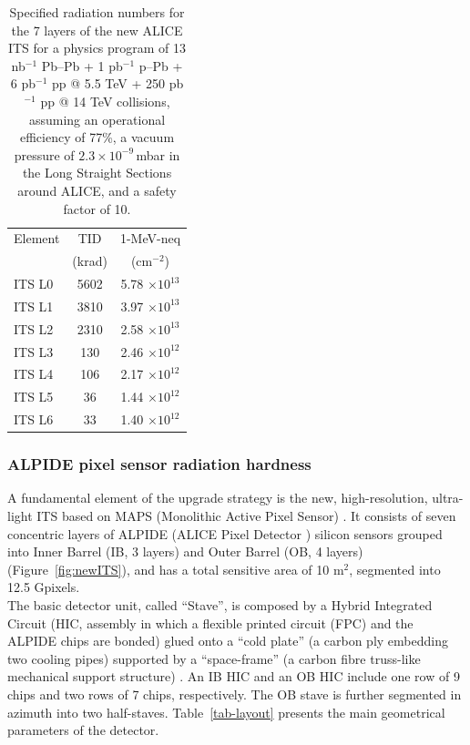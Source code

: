 \begin{table}[ht!]
\begin{minipage}{\textwidth}
\begin{center}
\begin{tabular}{l c c}
\toprule
Element		& TID  			& 1-MeV-neq	 	\\
			& (krad)		  	& (cm$^{-2}$)		\\
\midrule
ITS L0	 		& 5602	    	& 5.78 $\times 10^{13}$ \\
ITS L1		    	& 3810		& 3.97  $\times 10^{13}$\\
ITS L2			& 2310		& 2.58  $\times 10^{13}$\\
ITS L3			& 130		& 2.46  $\times 10^{12}$\\
ITS L4			& 106	    	& 2.17  $\times 10^{12}$\\
ITS L5			& 36			& 1.44  $\times 10^{12}$\\
ITS L6			& 33		  	& 1.40  $\times 10^{12}$\\

\midrule	
\end{tabular}
\end{center}
\caption{Specified radiation numbers for the 7 layers of the new ALICE ITS for a physics program of 13 nb$^{-1}$ Pb--Pb + 1 pb$^{-1}$ p--Pb + 6 pb$^{-1}$ pp @ 5.5 TeV + 250 pb$^{-1}$ pp @ 14 TeV collisions, assuming an operational efficiency of 77\%, a vacuum pressure of $2.3\times 10^{-9}$\,mbar in the Long Straight Sections around ALICE, and a safety factor of 10.}
\label{specifications}
\end{minipage}
\end{table}


\subsubsection{ALPIDE pixel sensor radiation hardness}
A fundamental element of the upgrade strategy is the new, high-resolution, ultra-light ITS based on MAPS (Monolithic Active Pixel Sensor) \cite{ITS-TDR}. It consists of seven concentric layers of  ALPIDE (ALICE Pixel Detector \cite{Rinella}) silicon sensors grouped into Inner Barrel (IB, 3 layers) and Outer Barrel (OB, 4 layers) (Figure~\ref{fig:newITS}), and has a total sensitive area of 10 m$^2$, segmented into 12.5 Gpixels.\\
The basic detector unit, called ``Stave'', is composed by a Hybrid Integrated Circuit (HIC, assembly in which a flexible printed circuit (FPC) and the ALPIDE chips are bonded) glued onto a ``cold plate'' (a carbon ply embedding two cooling pipes) supported by a ``space-frame'' (a carbon fibre truss-like mechanical support structure) \cite{dimauro}.  An IB HIC and an OB HIC include one row of 9 chips and two rows of 7 chips, respectively. The OB stave is further segmented in azimuth into two half-staves. Table~\ref{tab-layout} presents the main geometrical parameters of the detector.


